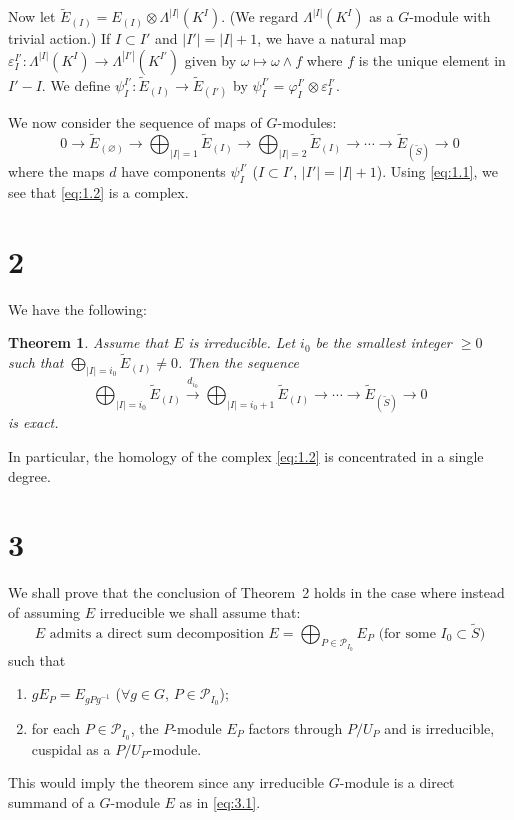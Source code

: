 \documentclass[12pt,a4paper]{article}
\theoremstyle{plain}
\newtheorem{theorem}{Theorem}
\theoremstyle{definition}
\theoremstyle{remark}
\newcommand{\cP}{\mathcal{P}}
\providecommand{\cP}{\mathcal{P}}
\begin{document}
Now let $\tilde{E}_{(I)} = E_{(I)} \otimes \Lambda^{|I|}(K^I)$. (We regard $\Lambda^{|I|}(K^I)$ as a $G$-module with trivial action.) If $I \subset I'$ and $|I'| = |I| + 1$, we have a natural map $\varepsilon_I^{I'} \colon \Lambda^{|I|}(K^I) \to \Lambda^{|I'|}(K^{I'})$ given by $\omega \mapsto \omega \wedge f$ where $f$ is the unique element in $I' - I$. We define $\psi_I^{I'} \colon \tilde{E}_{(I)} \to \tilde{E}_{(I')}$ by $\psi_I^{I'} = \varphi_I^{I'} \otimes \varepsilon_I^{I'}$.

We now consider the sequence of maps of $G$-modules:
\begin{equation}\label{eq:1.2}
0 \to \tilde{E}_{(\varnothing)} \to \bigoplus_{|I|=1} \tilde{E}_{(I)} \to \bigoplus_{|I|=2} \tilde{E}_{(I)} \to \cdots \to \tilde{E}_{(\tilde{S})} \to 0
\end{equation}
where the maps $d$ have components $\psi_I^{I'}$ ($I \subset I'$, $|I'| = |I|+1$). Using \eqref{eq:1.1}, we see that \eqref{eq:1.2} is a complex.

\section*{2}

We have the following:

\begin{theorem}
Assume that $E$ is irreducible. Let $i_0$ be the smallest integer $\geq 0$ such that $\bigoplus_{|I|=i_0} \tilde{E}_{(I)} \neq 0$. Then the sequence
\begin{equation}\label{eq:2.1}
\bigoplus_{|I|=i_0} \tilde{E}_{(I)} \xrightarrow{d_{i_0}} \bigoplus_{|I|=i_0+1} \tilde{E}_{(I)} \to \cdots \to \tilde{E}_{(\tilde{S})} \to 0
\end{equation}
is exact.
\end{theorem}

In particular, the homology of the complex \eqref{eq:1.2} is concentrated in a single degree.

\section*{3}

We shall prove that the conclusion of Theorem~2 holds in the case where instead of assuming $E$ irreducible we shall assume that:
\begin{equation}\label{eq:3.1}
\text{$E$ admits a direct sum decomposition $E = \bigoplus_{P \in \cP_{I_0}} E_P$ (for some $I_0 \subset \tilde{S}$)}
\end{equation}
such that
\begin{enumerate}[label=(\alph*)]
\item $gE_P = E_{gPg^{-1}}$ ($\forall g \in G$, $P \in \cP_{I_0}$);
\item for each $P \in \cP_{I_0}$, the $P$-module $E_P$ factors through $P/U_P$ and is irreducible, cuspidal as a $P/U_P$-module.
\end{enumerate}
This would imply the theorem since any irreducible $G$-module is a direct summand of a $G$-module $E$ as in \eqref{eq:3.1}.
\end{document}
